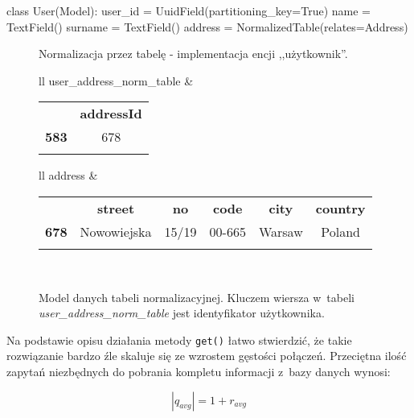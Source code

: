 \begin{verbbox}[\footnotesize]
class User(Model):
    user_id = UuidField(partitioning_key=True)
    name = TextField()
    surname = TextField()
    address = NormalizedTable(relates=Address)
\end{verbbox}

\begin{figure}[ht!]
	\centering
	\theverbbox
	\caption{Normalizacja przez tabelę - implementacja encji ,,użytkownik''.}
	\label{lst:normalization_by_table_example}
\end{figure}

\begin{figure}[ht!]
	\centering

	\begin{tabular}{ll}
		user\_address\_norm\_table &
		\begin{tabular}{|l||c|}
			\hhline{|-||-|}
		 	& \textbf{addressId} \\
			\hhline{|~||=|}
			\textbf{583} & 678 \\
			\hhline{|-||-|}
		\end{tabular} 	
	\end{tabular}
	
	\vspace{1em}

	\begin{tabular}{ll}
		address &
		\begin{tabular}{|l||c|c|c|c|c|}
			\hhline{|-||-----|}
		 	& \textbf{street} & \textbf{no} & \textbf{code} & \textbf{city} & \textbf{country} \\
			\hhline{|~||=====|}
			\textbf{678} & Nowowiejska & 15/19 & 00-665 & Warsaw & Poland \\
			\hhline{|-||-----|}
		\end{tabular} \\
	\end{tabular}

	\caption{Model danych tabeli normalizacyjnej. Kluczem wiersza w~tabeli \emph{user\_address\_norm\_table} jest identyfikator użytkownika.}
	\label{tab:address_normalization_table_data_model}
\end{figure}

Na podstawie opisu działania metody \verb+get()+ łatwo stwierdzić, że takie rozwiązanie bardzo źle skaluje się ze wzrostem gęstości połączeń. Przeciętna ilość zapytań niezbędnych do pobrania kompletu informacji z~bazy danych wynosi:

\begin{equation}
|q_{avg}| = 1 + r_{avg}
\end{equation}

